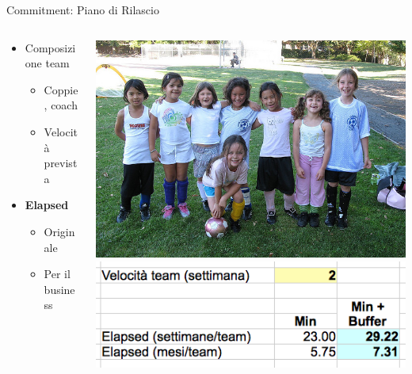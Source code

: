 	\begin{frame}{Commitment: Piano di Rilascio}

		\begin{columns}[T]
		    \begin{column}{.5\textwidth}

				\begin{itemize}
					\item Composizione team
					\begin{itemize}
						\item Coppie, coach
						\item Velocità prevista
					\end{itemize}
				\end{itemize}

				\begin{itemize}
					\item \textbf{Elapsed}
					\begin{itemize}
						\item Originale
						\item Per il business
					\end{itemize}
				\end{itemize}
		
	    	\end{column}
		    \begin{column}{.5\textwidth}
				\hspace*{-0.1cm} \includegraphics[scale=0.55]{images/team}
				\\ \vspace*{0.2cm}
				\hspace*{-0.2cm} \includegraphics[scale=0.35]{images/elapsed}
		    \end{column}
		\end{columns}


\end{frame}
